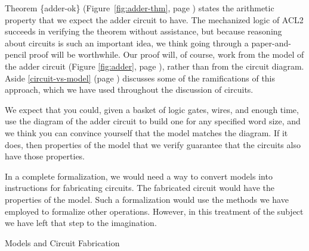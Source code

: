Theorem \{adder-ok\} (Figure~\ref{fig:adder-thm}, page \pageref{fig:adder-thm})
states the arithmetic property that we expect the adder circuit to have.
The mechanized logic of ACL2 succeeds in verifying
the theorem without assistance,
but because reasoning about circuits is such an important idea,
we think going through
a paper-and-pencil proof will be worthwhile.
Our proof will, of course, work from
the model of the adder circuit
(Figure \ref{fig:adder}, page \pageref{fig:adder}),
rather than from the circuit diagram.
Aside \ref{circuit-vs-model} (page \pageref{circuit-vs-model})
discusses some of the ramifications of this approach, 
which we have used throughout the discussion of circuits.

\begin{aside}
We expect that you could, given a basket of
logic gates, wires, and enough time,
use the diagram of the adder circuit to
build one for any specified word size,
and we think you can convince yourself that the model
matches the diagram.
If it does, then properties of the model
that we verify guarantee that the circuits also have those properties.

In a complete formalization, we would
need a way to convert models into instructions
for fabricating circuits.
The fabricated circuit would have the properties 
of the model. Such a formalization
would use the methods we have employed to formalize other operations.
However, in this treatment of the subject
we have left that step to the imagination.
\caption{Models and Circuit Fabrication}
\label{circuit-vs-model}
\end{aside}

